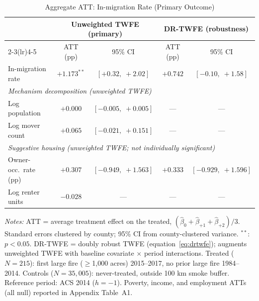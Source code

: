 \documentclass[12pt]{article}
\begin{document}
\begin{table}[ht]
\centering
\caption{Aggregate ATT: In-migration Rate (Primary Outcome)}
\label{tab:att_main}
\small
\begin{tabular}{lcccc}
\toprule
 & \multicolumn{2}{c}{Unweighted TWFE (primary)}
 & \multicolumn{2}{c}{DR-TWFE (robustness)} \\
\cmidrule(lr){2-3}\cmidrule(lr){4-5}
 & ATT (pp) & 95\% CI & ATT (pp) & 95\% CI \\
\midrule
In-migration rate  & $+1.173^{**}$ & $[+0.32,\; +2.02]$ & $+0.742$ & $[-0.10,\; +1.58]$ \\
\midrule
\multicolumn{5}{l}{\textit{Mechanism decomposition (unweighted TWFE)}} \\
Log population     & $+0.000$      & $[-0.005,\; +0.005]$ & --- & --- \\
Log mover count    & $+0.065$      & $[-0.021,\; +0.151]$ & --- & --- \\
\midrule
\multicolumn{5}{l}{\textit{Suggestive housing (unweighted TWFE; not individually significant)}} \\
Owner-occ.\ rate (pp)    & $+0.307$ & $[-0.949,\; +1.563]$ & $+0.333$ & $[-0.929,\; +1.596]$ \\
Log renter units         & $-0.028$ & \multicolumn{1}{c}{---} & --- & --- \\
\bottomrule
\end{tabular}
\medskip

\noindent\footnotesize
\textit{Notes:} ATT = average treatment effect on the treated,
$(\hat{\beta}_0 + \hat{\beta}_{+1} + \hat{\beta}_{+2}) / 3$.
Standard errors clustered by county; 95\% CI from county-clustered variance.
$^{**}$: $p < 0.05$.
DR-TWFE = doubly robust TWFE (equation~\eqref{eq:drtwfe});
augments unweighted TWFE with baseline covariate $\times$ period interactions.
Treated ($N = 215$): first large fire ($\geq$1,000 acres) 2015--2017,
no prior large fire 1984--2014.
Controls ($N = 35{,}005$): never-treated, outside 100 km smoke buffer.
Reference period: ACS 2014 ($h = -1$).
Poverty, income, and employment ATTs (all null) reported in Appendix Table~A1.
\end{table}
\end{document}

